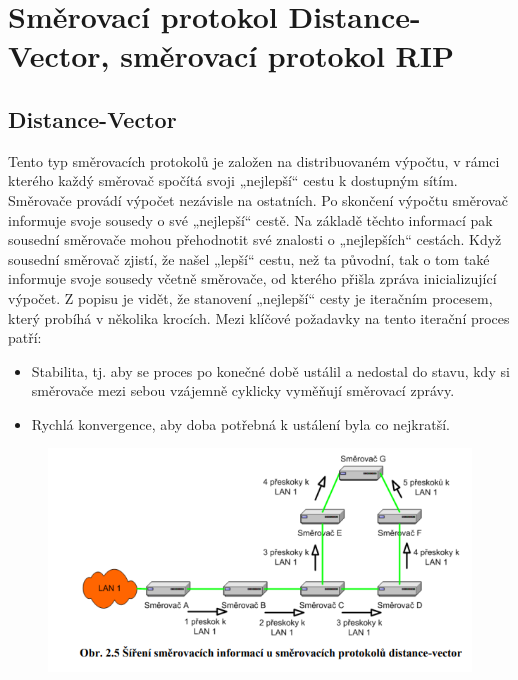 \section{Směrovací protokol Distance-Vector, směrovací protokol RIP}
\subsection{Distance-Vector}
Tento typ směrovacích protokolů je založen na distribuovaném výpočtu, v rámci 
kterého každý směrovač spočítá svoji „nejlepší“ cestu k dostupným sítím. Směrovače provádí 
výpočet nezávisle na ostatních. Po skončení výpočtu směrovač informuje svoje sousedy o své 
„nejlepší“ cestě. Na základě těchto informací pak sousední směrovače mohou přehodnotit své 
znalosti o „nejlepších“ cestách. Když sousední směrovač zjistí, že našel „lepší“ cestu, než ta 
původní, tak o tom také informuje svoje sousedy včetně směrovače, od kterého přišla zpráva 
inicializující výpočet. Z popisu je vidět, že stanovení „nejlepší“ cesty je iteračním procesem, 
který probíhá v několika krocích. Mezi klíčové požadavky na tento iterační 
proces patří:
\begin{itemize}
\item Stabilita, tj. aby se proces po konečné době ustálil a nedostal do stavu, kdy si 
směrovače mezi sebou vzájemně cyklicky vyměňují směrovací zprávy.
\item Rychlá konvergence, aby doba potřebná k ustálení byla co nejkratší.
\end{itemize}
\begin{figure}[!h]
  \begin{center}
    \includegraphics[scale=1]{images/distancevektor.png}
  \end{center}
\end{figure}

